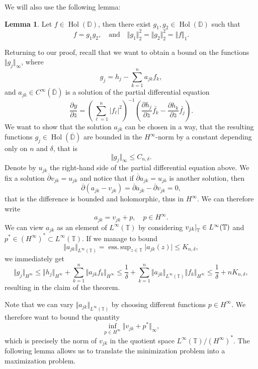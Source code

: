 \documentclass[letterpaper, 11pt]{article}
\newcommand{\D}{\mathbb{D}}
\newcommand{\T}{\mathbb{T}}
\newcommand{\1}{\mathds{1}}
\newcommand{\cl}[1]{\overline{#1}}
\newcommand{\restr}[2]{{%
  \left.\kern-\nulldelimiterspace %
  #1 %
  \littletaller %
  \right|_{#2} %
  }}
\newcommand{\littletaller}{\mathchoice{\vphantom{\big|}}{}{}{}}
\newcommand{\Wirtzbar}[1][]{\frac{\partial #1}{\partial \bar{z}}}
\newcommand{\wirtzbar}{\overline{\partial}}
\DeclareMathOperator*{\Hol}{Hol}
\DeclareMathOperator*{\esssup}{ess.\,sup}
\theoremstyle{definition}
\newtheorem{lemma}[theorem]{Lemma}
\newenvironment{innerproof}
 {\renewcommand{\qedsymbol}{}\proof}
 {\endproof}
\begin{document}
We will also use the following lemma:

\begin{lemma} \label{lem:factorisation}
  Let $f \in \Hol(\D)$, then there exist $g_1, g_2 \in \Hol(\D)$ such that
  $$ f = g_1 g_2, \quad \textrm{and} \quad \Vert g_1 \Vert_2^2 = \Vert g_2 \Vert_2^2 = \Vert f \Vert_1. $$
\end{lemma}

\begin{innerproof}[Proof (continued)]
  Returning to our proof, recall that we want to obtain a bound on the functions $\Vert g_j \Vert_\infty$, where
  $$ g_j = h_j - \sum_{k=1}^n a_{jk} f_k, $$
  and $a_{jk} \in C^\infty(\cl{\D})$ is a solution of the partial differential equation
  $$ \Wirtzbar[y] = \left( \sum_{\ell=1}^n \vert f_\ell \vert^2 \right)^{-1} \left( \Wirtzbar[h_j] \bar{f_k} - \Wirtzbar[h_k] \bar{f_j} \right). $$
  We want to show that the solution $a_{jk}$ can be chosen in a way, that the resulting functions $g_j \in \Hol(\cl{\D})$ are bounded in the $H^\infty$-norm by a constant depending only on $n$ and $\delta$, that is
  $$ \Vert g_j \Vert_\infty \leq C_{n, \delta}. $$
  Denote by $u_{jk}$ the right-hand side of the partial differential equation above. We fix a solution $\wirtzbar v_{jk} = u_{jk}$ and notice that if $\wirtzbar a_{jk} = u_{jk}$ is another solution, then
  $$ \wirtzbar (a_{jk} - v_{jk}) = \wirtzbar a_{jk} - \wirtzbar v_{jk} = 0, $$
  that is the difference is bounded and holomorphic, thus in $H^\infty$. We can therefore write
  $$ a_{jk} = v_{jk} + p, \quad p \in H^\infty. $$
  We can view $a_{jk}$ as an element of $L^\infty(\T)$ by considering $\restr{v_{jk}}{\T} \in L^\infty(\T)$ and $p^* \in (H^\infty)^* \subset L^\infty(\T)$. If we manage to bound
  $$ \Vert a_{jk} \Vert_{L^\infty(\T)} = \esssup_{z \in \T} \vert a_{jk}(z) \vert \leq K_{n,\delta}, $$
  we immediately get
  $$ \Vert g_j \Vert_{H^\infty} \leq \Vert h_j \Vert_{H^\infty} + \sum_{k=1}^n \Vert a_{jk} f_k \Vert_{H^\infty} \leq \frac{1}{\delta} + \sum_{k=1}^n \Vert a_{jk} \Vert_{L^\infty(\T)} \Vert f_k \Vert_{H^\infty} \leq \frac{1}{\delta} + n K_{n, \delta}, $$
  resulting in the claim of the theorem.

  Note that we can vary $\Vert a_{jk} \Vert_{L^\infty(\T)}$ by choosing different functions $p \in H^\infty$. We therefore want to bound the quantity
  $$ \inf_{p \in H^\infty} \Vert v_{jk} + p^* \Vert_\infty, $$
  which is precisely the norm of $v_{jk}$ in the quotient space $L^\infty(\T) / (H^\infty)^*$. The following lemma allows us to translate the minimization problem into a maximization problem.
\end{innerproof}
\end{document}
